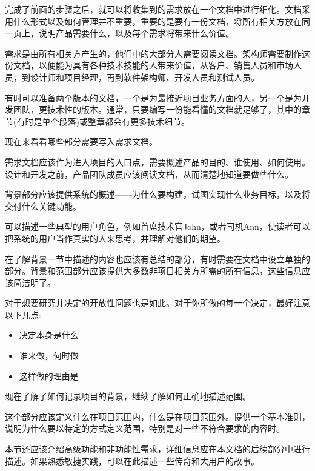 
完成了前面的步骤之后，就可以将收集到的需求放在一个文档中进行细化。文档采用什么形式以及如何管理并不重要，重要的是要有一份文档，将所有相关方放在同一页上，说明产品需要什么，以及每个需求将带来什么价值。

需求是由所有相关方产生的，他们中的大部分人需要阅读文档。架构师需要制作这份文档，以便能为具有各种技术技能的人带来价值，从客户、销售人员和市场人员，到设计师和项目经理，再到软件架构师、开发人员和测试人员。

有时可以准备两个版本的文档，一个是为最接近项目业务方面的人，另一个是为开发团队，更技术性的版本。通常，只要编写一份能看懂的文档就足够了，其中的章节(有时是单个段落)或整章都会有更多技术细节。

现在来看看哪些部分需要写入需求文档。


需求文档应该作为进入项目的入口点，需要概述产品的目的、谁使用、如何使用。设计和开发之前，产品团队成员应该阅读文档，从而清楚地知道要做些什么。

背景部分应该提供系统的概述——为什么要构建，试图实现什么业务目标，以及将交付什么关键功能。 

可以描述一些典型的用户角色，例如首席技术官John，或者司机Ann，使读者可以把系统的用户当作真实的人来思考，并理解对他们的期望。

在了解背景一节中描述的内容也应该有总结的部分，有时需要在文档中设立单独的部分。背景和范围部分应该提供大多数非项目相关方所需的所有信息，这些信息应该简洁明了。

对于想要研究并决定的开放性问题也是如此。对于你所做的每一个决定，最好注意以下几点:

\begin{itemize}
\item 
决定本身是什么

\item 
谁来做，何时做

\item 
这样做的理由是
\end{itemize}

现在了解了如何记录项目的背景，继续了解如何正确地描述范围。


这个部分应该定义什么在项目范围内，什么是在项目范围外。提供一个基本准则，说明为什么要以特定的方式定义范围，特别是对一些不符合要求的内容时。

本节还应该介绍高级功能和非功能性需求，详细信息应在本文档的后续部分中进行描述。如果熟悉敏捷实践，可以在此描述一些传奇和大用户的故事。

